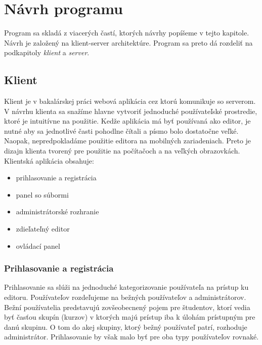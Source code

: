 \chapter{Návrh programu}

\label{kap:design} %

Program sa skladá z viacerých častí, ktorých návrhy popíšeme v tejto kapitole.
Návrh je založený na klient-server architektúre. Program sa preto dá rozdeliť na 
podkapitoly \textit{klient} a \textit{server}.


\section{Klient}
Klient je v bakalárskej práci webová aplikácia cez ktorú komunikuje so serverom. V návrhu klienta sa
snažíme hlavne vytvoriť jednoduché používateľské prostredie, ktoré je intuitívne na použitie. Kedže
aplikácia má byť používaná ako editor, je nutné aby sa jednotlivé časti pohodlne čítali a písmo bolo
dostatočne veľké. Naopak, nepredpokladáme použitie editora na mobilných zariadeniach. Preto je
dizajn klienta tvorený pre použitie na počítačoch a na veľkých obrazovkách. Klientská aplikácia
obsahuje:
\begin{itemize}
\item prihlasovanie a registrácia
\item panel so súbormi
\item administrátorské rozhranie
\item zdieľateľný editor
\item ovládací panel
\end{itemize}

\subsection{Prihlasovanie a registrácia}
Prihlasovanie sa slúži na jednoduché kategorizovanie používateľa na prístup ku editoru. 
Používateľov rozdeľujeme na bežných používateľov a administrátorov. Bežní používatelia predstavujú
zovšeobecnený pojem pre študentov, ktorí vedia byť časťou skupín (kurzov) v ktorých majú prístup
iba k úlohám prístupným pre danú skupinu. O tom do akej skupiny, ktorý bežný používateľ patrí, 
rozhoduje administrátor. Prihlasovanie by však malo byť pre oba typy používateľov rovnaké.

